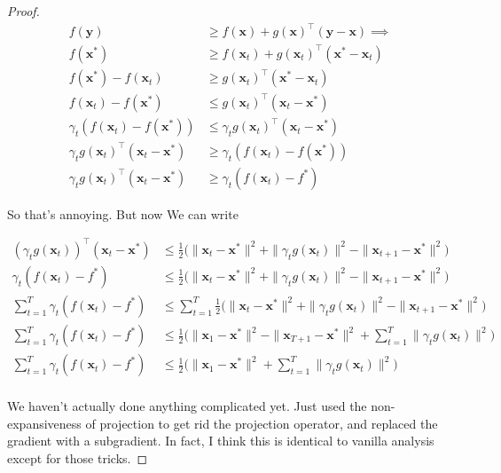 \documentclass{article}
\begin{document}
\begin{proof}
			\begin{align*}
				f(\mathbf{y}) &\ge f(\mathbf{x}) + g(\mathbf{x})^\top(\mathbf{y}-\mathbf{x})\implies\\
				f(\mathbf{x}^*) &\ge f(\mathbf{x}_t) + g(\mathbf{x}_t)^\top(\mathbf{x}^*-\mathbf{x}_t)\\
				f(\mathbf{x}^*) - f(\mathbf{x}_t) &\ge  g(\mathbf{x}_t)^\top(\mathbf{x}^*-\mathbf{x}_t)\\
				f(\mathbf{x}_t) - f(\mathbf{x}^*)   &\le  g(\mathbf{x}_t)^\top(\mathbf{x}_t - \mathbf{x}^*)\\
				\gamma_t(f(\mathbf{x}_t) - f(\mathbf{x}^*))   &\le  \gamma_tg(\mathbf{x}_t)^\top(\mathbf{x}_t - \mathbf{x}^*)\\
				 \gamma_tg(\mathbf{x}_t)^\top(\mathbf{x}_t - \mathbf{x}^*) &\ge   \gamma_t(f(\mathbf{x}_t) - f(\mathbf{x}^*)) \\
				  \gamma_tg(\mathbf{x}_t)^\top(\mathbf{x}_t - \mathbf{x}^*) &\ge   \gamma_t(f(\mathbf{x}_t) - f^*) 
			\end{align*}
			
			So that's annoying. But now We can write
			
			\begin{align*}
				(\gamma_t g(\mathbf{x}_t))^\top ( \mathbf{x}_t - \mathbf{x}^*)&\le\frac{1}{2}\big( \| \mathbf{x}_t - \mathbf{x}^* \|^2  + \|\gamma_t g(\mathbf{x}_t) \|^2  - \|\mathbf{x}_{t+1} - \mathbf{x}^* \|^2 \big)\\
				\gamma_t(f(\mathbf{x}_t) - f^*)  &\le \frac{1}{2}\big( \| \mathbf{x}_t - \mathbf{x}^* \|^2  + \|\gamma_t g(\mathbf{x}_t) \|^2  - \|\mathbf{x}_{t+1} - \mathbf{x}^* \|^2 \big)\\
				\sum^T_{t=1} \gamma_t(f(\mathbf{x}_t) - f^*)  &\le \sum^T_{t=1}\frac{1}{2}\big( \| \mathbf{x}_t - \mathbf{x}^* \|^2  + \|\gamma_t g(\mathbf{x}_t) \|^2  - \|\mathbf{x}_{t+1} - \mathbf{x}^* \|^2 \big)\\
				\sum^T_{t=1} \gamma_t(f(\mathbf{x}_t) - f^*)  &\le \frac{1}{2}\big( \| \mathbf{x}_1 - \mathbf{x}^* \|^2 - \|\mathbf{x}_{T+1} - \mathbf{x}^* \|^2 +  \sum^T_{t=1}  \|\gamma_t g(\mathbf{x}_t) \|^2   \big)\\
				\sum^T_{t=1} \gamma_t(f(\mathbf{x}_t) - f^*)  &\le \frac{1}{2}\big( \| \mathbf{x}_1 - \mathbf{x}^* \|^2  +  \sum^T_{t=1}  \|\gamma_t g(\mathbf{x}_t) \|^2   \big)\\
			\end{align*}
			
			We haven't actually done anything complicated yet. Just used the non-expansiveness of projection to get rid the projection operator, and replaced the gradient with a subgradient. In fact, I think this is identical to vanilla analysis except for those tricks.
			

\end{proof}
\end{document}
